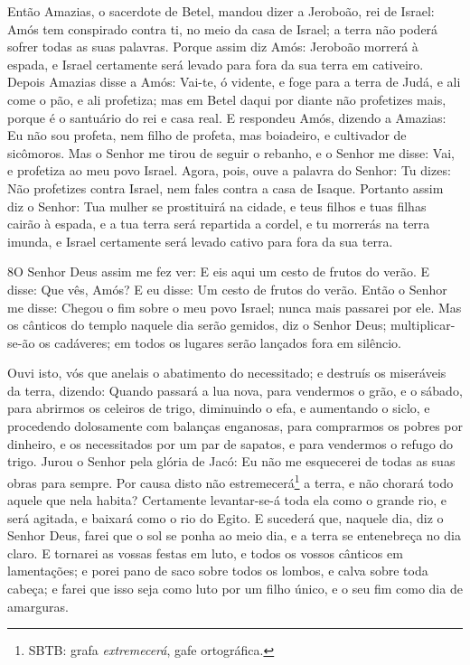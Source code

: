 Então Amazias, o sacerdote de Betel, mandou dizer a Jeroboão, rei
de Israel: Amós tem conspirado contra ti, no meio da casa de Israel;
a terra não poderá sofrer todas as suas palavras. Porque
assim diz Amós: Jeroboão morrerá à espada, e Israel certamente será
levado para fora da sua terra em cativeiro. Depois Amazias
disse a Amós: Vai-te, ó vidente, e foge para a terra de Judá, e ali
come o pão, e ali profetiza; mas em Betel daqui por diante
não profetizes mais, porque é o santuário do rei e casa real.
E respondeu Amós, dizendo a Amazias: Eu não sou profeta, nem
filho de profeta, mas boiadeiro, e cultivador de sicômoros.
Mas o Senhor me tirou de seguir o rebanho, e o Senhor me
disse: Vai, e profetiza ao meu povo Israel. Agora, pois, ouve
a palavra do Senhor: Tu dizes: Não profetizes contra Israel, nem
fales contra a casa de Isaque. Portanto assim diz o Senhor:
Tua mulher se prostituirá na cidade, e teus filhos e tuas filhas
cairão à espada, e a tua terra será repartida a cordel, e tu
morrerás na terra imunda, e Israel certamente será levado cativo
para fora da sua terra.

\medskip

\lettrine{8} O Senhor Deus assim me fez ver: E eis aqui um
cesto de frutos do verão. E disse: Que vês, Amós? E eu disse: Um
cesto de frutos do verão. Então o Senhor me disse: Chegou o fim
sobre o meu povo Israel; nunca mais passarei por ele. Mas os
cânticos do templo naquele dia serão gemidos, diz o Senhor Deus;
multiplicar-se-ão os cadáveres; em todos os lugares serão lançados
fora em silêncio.

Ouvi isto, vós que anelais o abatimento do necessitado; e destruís
os miseráveis da terra, dizendo: Quando passará a lua nova, para
vendermos o grão, e o sábado, para abrirmos os celeiros de trigo,
diminuindo o efa, e aumentando o siclo, e procedendo dolosamente com
balanças enganosas, para comprarmos os pobres por dinheiro, e os
necessitados por um par de sapatos, e para vendermos o refugo do
trigo. Jurou o Senhor pela glória de Jacó: Eu não me esquecerei
de todas as suas obras para sempre. Por causa disto não
estremecerá\footnote{SBTB: grafa \emph{extremecerá}, gafe
ortográfica.} a terra, e não chorará todo aquele que nela habita?
Certamente levantar-se-á toda ela como o grande rio, e será agitada,
e baixará como o rio do Egito. E sucederá que, naquele dia, diz
o Senhor Deus, farei que o sol se ponha ao meio dia, e a terra se
entenebreça no dia claro. E tornarei as vossas festas em
luto, e todos os vossos cânticos em lamentações; e porei pano de
saco sobre todos os lombos, e calva sobre toda cabeça; e farei que
isso seja como luto por um filho único, e o seu fim como dia de
amarguras.

